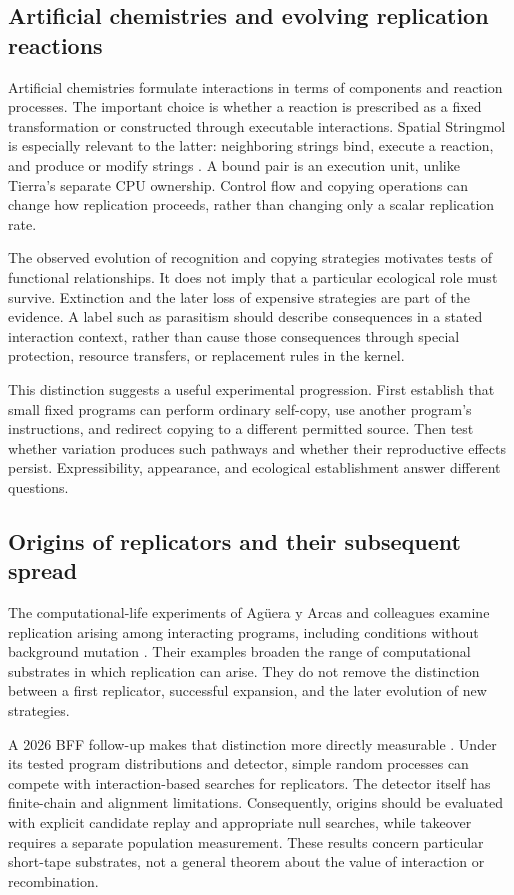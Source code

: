 \subsection{Artificial chemistries and evolving replication reactions}
Artificial chemistries formulate interactions in terms of components and
reaction processes. The important choice is whether a reaction is prescribed
as a fixed transformation or constructed through executable interactions.
Spatial Stringmol is especially relevant to the latter: neighboring strings
bind, execute a reaction, and produce or modify strings
\citep{Hickinbotham2021}. A bound pair is an execution unit, unlike Tierra's
separate CPU ownership. Control flow and copying operations can change how
replication proceeds, rather than changing only a scalar replication rate.

The observed evolution of recognition and copying strategies motivates tests
of functional relationships. It does not imply that a particular ecological
role must survive. Extinction and the later loss of expensive strategies are
part of the evidence. A label such as parasitism should describe consequences
in a stated interaction context, rather than cause those consequences through
special protection, resource transfers, or replacement rules in the kernel.

This distinction suggests a useful experimental progression. First establish
that small fixed programs can perform ordinary self-copy, use another
program's instructions, and redirect copying to a different permitted source.
Then test whether variation produces such pathways and whether their
reproductive effects persist. Expressibility, appearance, and ecological
establishment answer different questions.

\subsection{Origins of replicators and their subsequent spread}
The computational-life experiments of Ag\"uera y Arcas and colleagues examine
replication arising among interacting programs, including conditions without
background mutation \citep{Aguera2024}. Their examples broaden the range of
computational substrates in which replication can arise. They do not remove
the distinction between a first replicator, successful expansion, and the
later evolution of new strategies.

A 2026 BFF follow-up makes that distinction more directly measurable
\citep{Knierim2026}. Under its tested program distributions and detector,
simple random processes can compete with interaction-based searches for
replicators. The detector itself has finite-chain and alignment limitations.
Consequently, origins should be evaluated with explicit candidate replay and
appropriate null searches, while takeover requires a separate population
measurement. These results concern particular short-tape substrates, not a
general theorem about the value of interaction or recombination.

